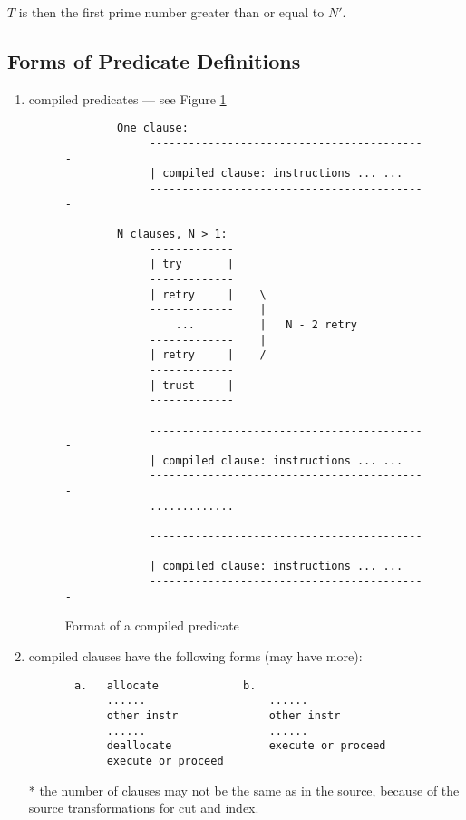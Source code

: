 \documentclass[11pt]{article}
\begin{document}
$T$ is then the first prime number greater than or equal to $N'$.


\subsection{Forms of Predicate Definitions}

\begin{enumerate}
    \item compiled predicates --- see Figure \ref{f:cmppred}

\begin{figure}
\begin{verbatim}
        One clause:
             -------------------------------------------
             | compiled clause: instructions ... ...
             -------------------------------------------
   
        N clauses, N > 1:
             -------------
             | try       |
             -------------
             | retry     |    \
             -------------    |
                 ...          |   N - 2 retry
             -------------    |
             | retry     |    /
             -------------
             | trust     |
             -------------

             -------------------------------------------
             | compiled clause: instructions ... ...
             -------------------------------------------
             .............

             -------------------------------------------
             | compiled clause: instructions ... ...
             -------------------------------------------
\end{verbatim}
\caption{Format of a compiled predicate}
\label{f:cmppred}
\end{figure}

    \item compiled clauses have the following forms (may have more):
\begin{verbatim}
       a.   allocate             b.
            ......                   ......
            other instr              other instr
            ......                   ......
            deallocate               execute or proceed
            execute or proceed
\end{verbatim}

   * the number of clauses may not be the same as in the source,
     because of the source transformations for cut and index.


\end{enumerate}
\end{document}
